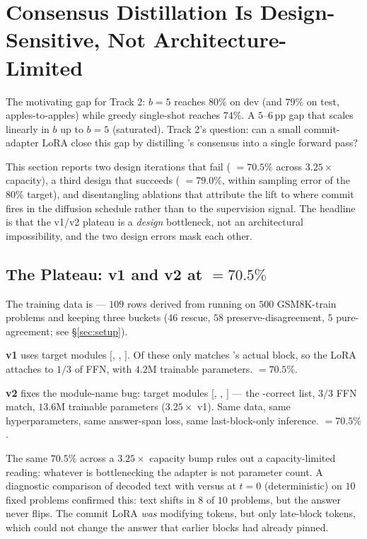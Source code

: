 \section{Consensus Distillation Is Design-Sensitive, Not Architecture-Limited}
\label{sec:distill}

The motivating gap for Track 2: \cmaj{} $b{=}5$ reaches $80\%$ on
dev (and $79\%$ on test, apples-to-apples) while greedy single-shot
\ctwo{} reaches $74\%$.  A $5\text{--}6$\,pp gap that scales
linearly in $b$ up to $b{=}5$ (saturated).  Track 2's question:
can a small commit-adapter LoRA close this gap by distilling
\cmaj{}'s consensus into a single forward pass?

This section reports two design iterations that fail (\ctwoc{} $=
70.5\%$ across $3.25\times$ capacity), a third design that succeeds
(\ctwoc{} $= 79.0\%$, within sampling error of the $80\%$ target),
and disentangling ablations that attribute the lift to where
commit fires in the diffusion schedule rather than to the
supervision signal.  The headline is that the v1/v2 plateau is a
\emph{design} bottleneck, not an architectural impossibility, and
the two design errors mask each other.

\subsection{The Plateau: v1 and v2 at \ctwoc{} $= 70.5\%$}
\label{subsec:distill_plateau}

The training data is  ---
$109$ rows derived from running \cmaj{} on $500$ GSM8K-train
problems and keeping three buckets ($46$ rescue, $58$
preserve-disagreement, $5$ pure-agreement; see \S\ref{sec:setup}).

\textbf{v1} uses target modules $[$,
, $]$.  Of these only
 matches \LLaDA{}'s actual block, so the LoRA
attaches to $1/3$ of FFN, with $4.2$M trainable parameters.
\ctwoc{} $= 70.5\%$.

\textbf{v2} fixes the module-name bug: target modules
$[$, , $]$ --- the
\LLaDA{}-correct list, $3/3$ FFN match, $13.6$M trainable
parameters ($3.25\times$ v1).  Same data, same hyperparameters,
same answer-span loss, same last-block-only inference.
\ctwoc{} $= 70.5\%$.

The same $70.5\%$ across a $3.25\times$ capacity bump rules out a
capacity-limited reading: whatever is bottlenecking the adapter is
not parameter count.  A diagnostic comparison of decoded text with
 versus  at $t{=}0$
(deterministic) on $10$ fixed problems confirmed this: text
shifts in $8$ of $10$ problems, but the answer never flips.  The
commit LoRA \emph{was} modifying tokens, but only late-block
tokens, which could not change the answer that earlier blocks had
already pinned.

